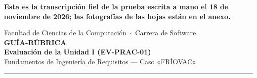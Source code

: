 \documentclass[11pt]{article}
\newif\ifclave
\begin{document}
	
	\noindent\textbf{Esta es la transcripción fiel de la prueba escrita a mano el 18 de noviembre de 2026; las fotografías de las hojas están en el anexo.}
	
	\bigskip
	
	
	\vspace{6pt}
	\begin{center}
		{\large Facultad de Ciencias de la Computación \,$\cdot$\, Carrera de Software}\\[10pt]
		{\LARGE\textbf{\textcolor{utegreendk}{GUÍA-RÚBRICA}}}\\[4pt]
		{\Large\textbf{Evaluación de la Unidad I (EV-PRAC-01)}}\\[4pt]
		{\large Fundamentos de Ingeniería de Requisitos --- Caso «FRÍOVAC»}\\[2pt]
		\ifclave{\normalsize\textbf{\textcolor{red!60!black}{VERSIÓN DOCENTE: incluye la clave orientativa. No distribuir.}}}\\[2pt]\fi
	\end{center}
	\noindent\textcolor{gold}{\rule{\linewidth}{1.5pt}}
	
\end{document}
